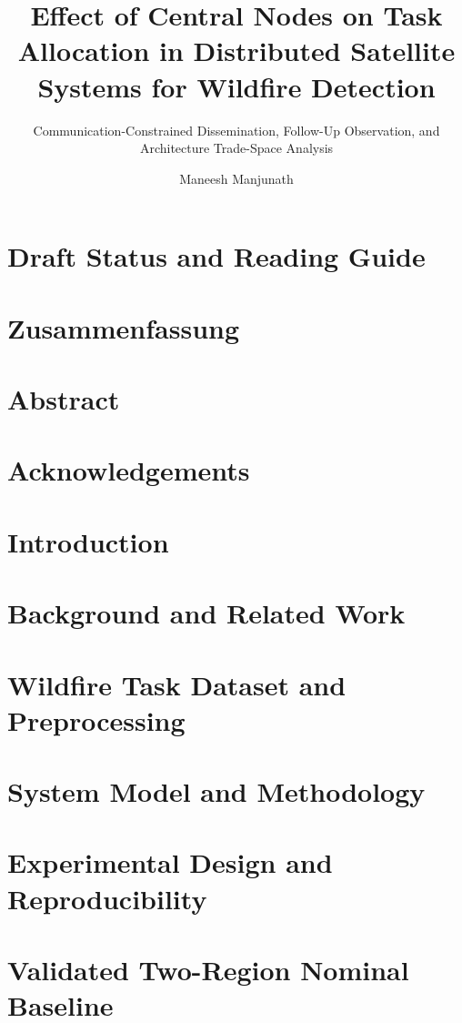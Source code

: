 \documentclass[
  a4paper,
  thesis=student,
  english,
  coverpage=false,
  titlepage=false,
  oneside,
  headmarks=true
]{tumbook}
\title{Effect of Central Nodes on Task Allocation in Distributed Satellite Systems for Wildfire Detection}
\subtitle{Communication-Constrained Dissemination, Follow-Up Observation, and Architecture Trade-Space Analysis}
\author{Maneesh Manjunath}
\begin{document}
\frontmatter
\maketitle

\chapter{Draft Status and Reading Guide}

\chapter{Zusammenfassung}

\chapter{Abstract}

\chapter{Acknowledgements}


\tableofcontents
\listoffigures
{}
\listoftables
{}
\glsaddall
\printnoidxglossaries

\mainmatter
\chapter{Introduction}

\chapter{Background and Related Work}

\chapter{Wildfire Task Dataset and Preprocessing}

\chapter{System Model and Methodology}

\chapter{Experimental Design and Reproducibility}

\chapter{Validated Two-Region Nominal Baseline}

\end{document}
